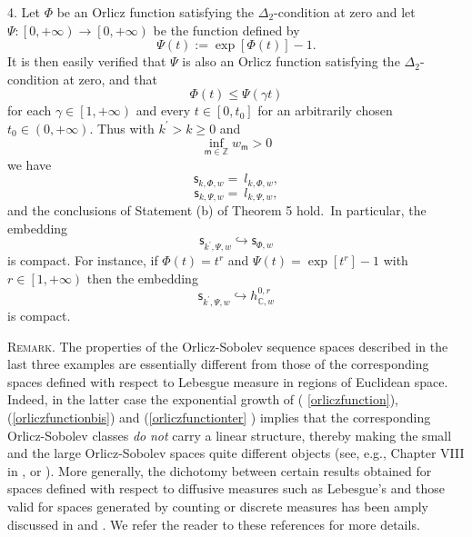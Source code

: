 \documentclass{article}
\begin{document}
4. Let $\Phi $ be an Orlicz function satisfying the $\Delta _{2}$-condition
at zero and let $\Psi :\left[ 0,+\infty \right) \rightarrow \left[ 0,+\infty
\right) $ be the function defined by%
\begin{equation}
\Psi (t):=\exp \left[ \Phi (t)\right] -1.  \label{orliczfunctionter}
\end{equation}%
It is then easily verified that $\Psi $ is also an Orlicz function
satisfying the $\Delta _{2}$-condition at zero, and that%
\begin{equation*}
\Phi (t)\leq \Psi (\gamma t)
\end{equation*}%
for each $\gamma \in \left[ 1,+\infty \right) $ and every $t\in \left[
0,t_{0}\right] $ for an arbitrarily chosen $t_{0}\in \left( 0,+\infty
\right) .$ Thus with $k^{\prime }>k\geq 0$ and%
\begin{equation*}
\inf_{\mathsf{m\in }\mathbb{Z}}w_{\mathsf{m}}>0
\end{equation*}%
we have%
\begin{equation*}
\mathsf{s}_{k,\Phi ,w}=\ l_{k,\Phi ,w},
\end{equation*}%
\begin{equation*}
\mathsf{s}_{k,\Psi ,w}=\ l_{k,\Psi ,w},
\end{equation*}%
and the conclusions of Statement (b) of Theorem 5 hold.\textsf{\ }In
particular, the embedding%
\begin{equation*}
\mathsf{s}_{k^{\prime },\Psi ,w}\hookrightarrow \mathsf{s}_{\Phi ,w}
\end{equation*}%
is compact. For instance, if $\Phi \left( t\right) =t^{r}$ and $\Psi
(t)=\exp \left[ t^{r}\right] -1$ with $r\in \left[ 1,+\infty \right) $ then
the embedding%
\begin{equation*}
\mathsf{s}_{k^{\prime },\Psi ,w}\hookrightarrow h_{\mathbb{C},w}^{0,r}
\end{equation*}%
is compact.

\bigskip

\textsc{Remark. }The properties of the Orlicz-Sobolev sequence spaces
described in the last three examples are essentially different from those of
the corresponding spaces defined with respect to Lebesgue measure in regions
of Euclidean space. Indeed, in the latter case the exponential growth of (%
\ref{orliczfunction}), (\ref{orliczfunctionbis}) and (\ref{orliczfunctionter}%
) implies that the corresponding Orlicz-Sobolev classes \textit{do} \textit{%
not} carry a linear structure, thereby making the small and the large
Orlicz-Sobolev spaces quite different objects (see, e.g., Chapter VIII in 
\cite{adamsfournier}, or \cite{krasnorut}). More generally, the dichotomy
between certain results obtained for spaces defined with respect to
diffusive measures such as Lebesgue's and those valid for spaces generated
by counting or discrete measures has been amply discussed in \cite{raoren1}
and \cite{raoren2}. We refer the reader to these references for more details.
\end{document}

